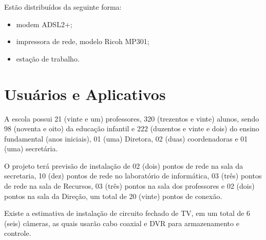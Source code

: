 \documentclass[	DIV=calc,%
							paper=a4,%
							fontsize=12pt,%
							onecolumn]{scrartcl}	 					%
\begin{document}
Estão distribuídos da seguinte forma:
\begin{itemize}
	\item modem ADSL2+;
	\item impressora de rede, modelo Ricoh MP301;
	\item estação de trabalho.
\end{itemize}


\section{Usuários e Aplicativos}
A escola possui 21 (vinte e um) professores, 320 (trezentos e vinte) alunos, sendo 98 (noventa e oito) da educação infantil e 222 (duzentos e vinte e dois) do ensino fundamental (anos iniciais), 01 (uma) Diretora, 02 (duas) coordenadoras e 01 (uma) secretária.

O projeto terá previsão de instalação de 02 (dois) pontos de rede na sala da secretaria, 10 (dez) pontos de rede no laboratório de informática, 03 (três) pontos de rede na sala de Recursos, 03 (três) pontos na sala dos professores e 02 (dois) pontos na sala da Direção, um total de 20 (vinte) pontos de conexão.

Existe a estimativa de instalação de circuito fechado de TV, em um total de 6 (seis) câmeras, as quais usarão cabo coaxial e DVR para armazenamento e controle.
\end{document}
